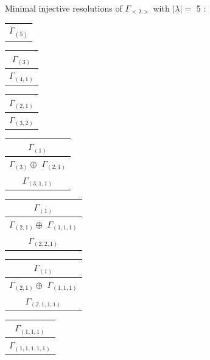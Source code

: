 \documentclass[main.tex]{subfiles}
\begin{document}
\bigskip
Minimal injective resolutions of $\Gamma_{<\lambda>}$ with $|\lambda| = $ 5 : \\
\begin{minipage}{.2\textwidth}
\centering
\begin{tabular}{c}
$\Gamma_{(
5
)}$
\\
\end{tabular}\end{minipage}
\begin{minipage}{.2\textwidth}
\centering
\begin{tabular}{c}
$\Gamma_{(
3
)}$
\\ \hline
$\Gamma_{(
4 , 
1
)}$
\\
\end{tabular}\end{minipage}
\begin{minipage}{.2\textwidth}
\centering
\begin{tabular}{c}
$\Gamma_{(
2 , 
1
)}$
\\ \hline
$\Gamma_{(
3 , 
2
)}$
\\
\end{tabular}\end{minipage}
\begin{minipage}{.2\textwidth}
\centering
\begin{tabular}{c}
$\Gamma_{(
1
)}$
\\ \hline
$\Gamma_{(
3
)} \oplus$
$\Gamma_{(
2 , 
1
)}$
\\ \hline
$\Gamma_{(
3 , 
1 , 
1
)}$
\\
\end{tabular}\end{minipage}
\begin{minipage}{.2\textwidth}
\centering
\begin{tabular}{c}
$\Gamma_{(
1
)}$
\\ \hline
$\Gamma_{(
2 , 
1
)} \oplus$
$\Gamma_{(
1 , 
1 , 
1
)}$
\\ \hline
$\Gamma_{(
2 , 
2 , 
1
)}$
\\
\end{tabular}\end{minipage}
\bigskip
\begin{minipage}{.2\textwidth}
\centering
\begin{tabular}{c}
$\Gamma_{(
1
)}$
\\ \hline
$\Gamma_{(
2 , 
1
)} \oplus$
$\Gamma_{(
1 , 
1 , 
1
)}$
\\ \hline
$\Gamma_{(
2 , 
1 , 
1 , 
1
)}$
\\
\end{tabular}\end{minipage}
\begin{minipage}{.2\textwidth}
\centering
\begin{tabular}{c}
$\Gamma_{(
1 , 
1 , 
1
)}$
\\ \hline
$\Gamma_{(
1 , 
1 , 
1 , 
1 , 
1
)}$
\\
\end{tabular}\end{minipage}
\end{document}
